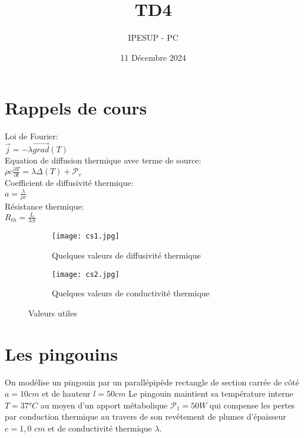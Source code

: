 \documentclass{article}
\title{TD4}
\author{IPESUP - PC }
\date{11 Décembre 2024}
\begin{document}
\maketitle



\section{Rappels de cours}
Loi de Fourier: 
\\[0.1cm]

$\vec{j}=-\lambda \vec{grad} (T) $
\\[0.1cm]

Equation de diffusion thermique avec terme de source:
\\[0.1cm]

$\rho c \frac{\partial T}{\partial t }=\lambda \Delta (T) + \mathcal{P}_v$ 
\\[0.2cm]
Coefficient de diffusivité thermique: 
\\[0.1cm]

$a=\frac{\lambda}{\rho c}$
 \\[0.1cm]

Résistance thermique: 
\\[0.1cm]

$R_{th} = \frac{L}{\lambda S}$


\begin{figure}[h]
  \centering
  \begin{subfigure}{0.3\textwidth}
    \texttt{[image: cs1.jpg]}
    \caption{Quelques valeurs de diffusivité thermique}
    \label{fig:subfig1}
  \end{subfigure}
  \hfill
  \begin{subfigure}{0.4\textwidth}
    \texttt{[image: cs2.jpg]}
    \caption{Quelques valeurs de conductivité thermique}
    \label{fig:subfig2}
  \end{subfigure}
  \caption{Valeurs utiles}
  \label{fig:general}
\end{figure}
 

\section{Les pingouins}
On modélise un pingouin par un parallépipède rectangle de section carrée de côté $a=10cm$ et de hauteur $l = 50 cm$  Le pingouin maintient sa température interne $T = 37 $°$ C$ au moyen
d'un apport métabolique $\mathcal{P}_1 = 50 W $ qui compense les pertes par conduction thermique au
travers de son revêtement de plumes d'épaisseur $e = 1,0 $ $cm$ et de conductivité thermique $\lambda$.
\end{document}
